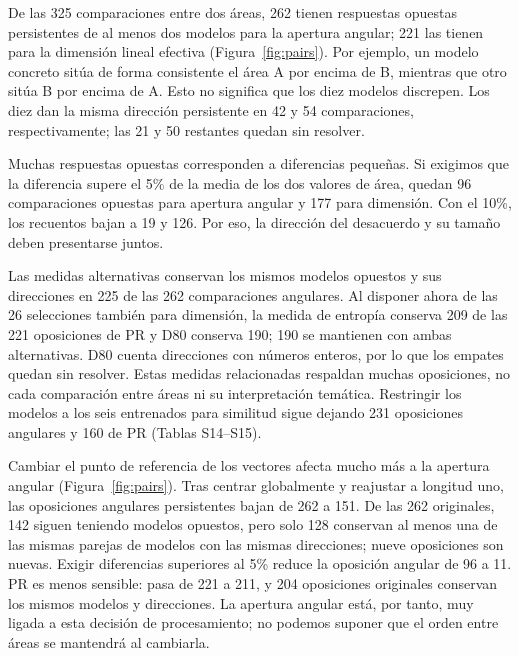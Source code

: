 \documentclass[12pt]{article}
\begin{document}
De las 325 comparaciones entre dos áreas, 262 tienen respuestas opuestas persistentes de al menos dos modelos para la apertura angular; 221 las tienen para la dimensión lineal efectiva (Figura~\ref{fig:pairs}). Por ejemplo, un modelo concreto sitúa de forma consistente el área A por encima de B, mientras que otro sitúa B por encima de A. Esto no significa que los diez modelos discrepen. Los diez dan la misma dirección persistente en 42 y 54 comparaciones, respectivamente; las 21 y 50 restantes quedan sin resolver.

Muchas respuestas opuestas corresponden a diferencias pequeñas. Si exigimos que la diferencia supere el 5\% de la media de los dos valores de área, quedan 96 comparaciones opuestas para apertura angular y 177 para dimensión. Con el 10\%, los recuentos bajan a 19 y 126. Por eso, la dirección del desacuerdo y su tamaño deben presentarse juntos.

Las medidas alternativas conservan los mismos modelos opuestos y sus direcciones en 225 de las 262 comparaciones angulares. Al disponer ahora de las 26 selecciones también para dimensión, la medida de entropía conserva 209 de las 221 oposiciones de PR y D80 conserva 190; 190 se mantienen con ambas alternativas. D80 cuenta direcciones con números enteros, por lo que los empates quedan sin resolver. Estas medidas relacionadas respaldan muchas oposiciones, no cada comparación entre áreas ni su interpretación temática. Restringir los modelos a los seis entrenados para similitud sigue dejando 231 oposiciones angulares y 160 de PR (Tablas S14--S15).

Cambiar el punto de referencia de los vectores afecta mucho más a la apertura angular (Figura~\ref{fig:pairs}). Tras centrar globalmente y reajustar a longitud uno, las oposiciones angulares persistentes bajan de 262 a 151. De las 262 originales, 142 siguen teniendo modelos opuestos, pero solo 128 conservan al menos una de las mismas parejas de modelos con las mismas direcciones; nueve oposiciones son nuevas. Exigir diferencias superiores al 5\% reduce la oposición angular de 96 a 11. PR es menos sensible: pasa de 221 a 211, y 204 oposiciones originales conservan los mismos modelos y direcciones. La apertura angular está, por tanto, muy ligada a esta decisión de procesamiento; no podemos suponer que el orden entre áreas se mantendrá al cambiarla.
\end{document}
